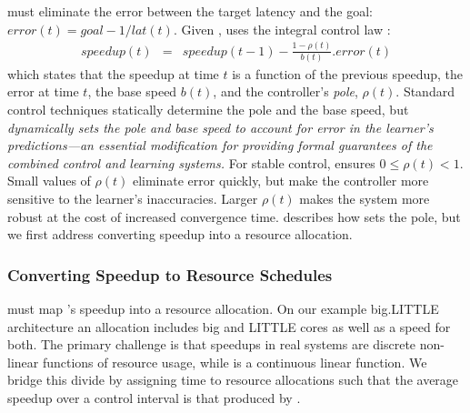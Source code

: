 \SYSTEM{} must eliminate the error between the target latency and the goal: $ error(t) = goal - 1/lat(t)$.
Given , \SYSTEM{} uses the integral control law
\cite{Hellerstein2004a}:
\begin{eqnarray}
  speedup(t) &=& speedup(t-1) - \frac{1 - \rho(t)}{b(t)}.error(t)
  \label{eqn:speedup-control}
\end{eqnarray}
which states that the speedup at time $t$ is a function of the
previous speedup, the error at time $t$, the base speed $b(t)$, and
the controller's \emph{pole}, $\rho(t)$.  Standard control techniques
statically determine the pole and the base speed, but \SYSTEM{}
\emph{dynamically sets the pole and base speed to account for error in
  the learner's predictions---an essential modification for providing
  formal guarantees of the combined control and learning systems.}
For stable control, \SYSTEM{} ensures $0 \le \rho(t) < 1$. Small
values of $\rho(t)$ eliminate error quickly, but make the controller
more sensitive to the learner's inaccuracies.  Larger $\rho(t)$ makes
the system more robust at the cost of increased convergence time.
 describes how \SYSTEM{} sets the pole, but we
first address converting speedup into a resource allocation.

\subsubsection{Converting Speedup to Resource Schedules}
\SYSTEM{} must map 's speedup into a resource
allocation.  On our example big.LITTLE architecture an allocation
includes big and LITTLE cores as well as a speed for both.  The
primary challenge is that speedups in real systems are discrete
non-linear functions of resource usage, while 
is a continuous linear function.  We bridge this divide by assigning
time to resource allocations such that the average speedup over a
control interval is that produced by .


